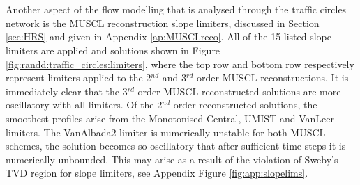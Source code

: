 	\\ \\
	Another aspect of the flow modelling that is analysed through the traffic circles network is the MUSCL reconstruction slope limiters, discussed in Section \ref{sec:HRS} and given in Appendix \ref{ap:MUSCLreco}. All of the 15 listed slope limiters are applied and solutions shown in Figure \ref{fig:randd:traffic_circles:limiters}, where the top row and bottom row respectively represent limiters applied to the 2$^{nd}$ and 3$^{rd}$ order MUSCL reconstructions. It is immediately clear that the 3$^{rd}$ order MUSCL reconstructed solutions are more oscillatory with all limiters. Of the 2$^{nd}$ order reconstructed solutions, the smoothest profiles arise from the Monotonised Central, UMIST and VanLeer limiters. The VanAlbada2 limiter is numerically unstable for both MUSCL schemes, the solution becomes so oscillatory that after sufficient time steps it is numerically unbounded. This may arise as a result of the violation of Sweby's TVD region \cite{Sweby84} for slope limiters, see Appendix Figure \ref{fig:app:slopelims}.

